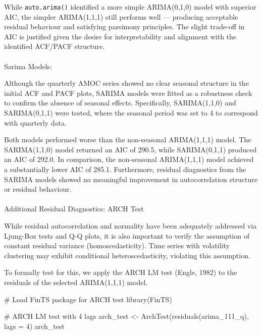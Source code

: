 \documentclass[
  11pt,
]{article}
\makeatletter
\let\oldparagraph\paragraph
\renewcommand{\paragraph}{
    \@ifstar
      \xxxParagraphStar
      \xxxParagraphNoStar
  }
\newcommand{\xxxParagraphStar}[1]{\oldparagraph*{#1}\mbox{}}
\newcommand{\xxxParagraphNoStar}[1]{\oldparagraph{#1}\mbox{}}
\newenvironment{Shaded}{\begin{snugshade}}{\end{snugshade}}
\newcommand{\AttributeTok}[1]{\textcolor[rgb]{0.40,0.45,0.13}{#1}}
\newcommand{\CommentTok}[1]{\textcolor[rgb]{0.37,0.37,0.37}{#1}}
\newcommand{\DecValTok}[1]{\textcolor[rgb]{0.68,0.00,0.00}{#1}}
\newcommand{\FunctionTok}[1]{\textcolor[rgb]{0.28,0.35,0.67}{#1}}
\newcommand{\NormalTok}[1]{\textcolor[rgb]{0.00,0.23,0.31}{#1}}
\newcommand{\OtherTok}[1]{\textcolor[rgb]{0.00,0.23,0.31}{#1}}
\makeatother
\begin{document}
While \texttt{auto.arima()} identified a more simple ARIMA(0,1,0) model
with superior AIC, the simpler ARIMA(1,1,1) still performs well ---
producing acceptable residual behaviour and satisfying parsimony
principles. The slight trade-off in AIC is justified given the desire
for interpretability and alignment with the identified ACF/PACF
structure.

\paragraph{Sarima Models:}\label{sarima-models}

Although the quarterly AMOC series showed no clear seasonal structure in
the initial ACF and PACF plots, SARIMA models were fitted as a
robustness check to confirm the absence of seasonal effects.
Specifically, SARIMA(1,1,0) and SARIMA(0,1,1) were tested, where the
seasonal period was set to 4 to correspond with quarterly data.

Both models performed worse than the non-seasonal ARIMA(1,1,1) model.
The SARIMA(1,1,0) model returned an AIC of 290.5, while SARIMA(0,1,1)
produced an AIC of 292.0. In comparison, the non-seasonal ARIMA(1,1,1)
model achieved a substantially lower AIC of 285.1. Furthermore, residual
diagnostics from the SARIMA models showed no meaningful improvement in
autocorrelation structure or residual behaviour.

\paragraph{Additional Residual Diagnostics: ARCH
Test}\label{additional-residual-diagnostics-arch-test}

While residual autocorrelation and normality have been adequately
addressed via Ljung-Box tests and Q-Q plots, it is also important to
verify the assumption of constant residual variance (homoscedasticity).
Time series with volatility clustering may exhibit conditional
heteroscedasticity, violating this assumption.

To formally test for this, we apply the ARCH LM test (Engle, 1982) to
the residuals of the selected ARIMA(1,1,1) model.

\begin{Shaded}
\begin{Highlighting}[]
\CommentTok{\# Load FinTS package for ARCH test}
\FunctionTok{library}\NormalTok{(FinTS)}

\CommentTok{\# ARCH LM test with 4 lags}
\NormalTok{arch\_test }\OtherTok{\textless{}{-}} \FunctionTok{ArchTest}\NormalTok{(}\FunctionTok{residuals}\NormalTok{(arima\_111\_q), }\AttributeTok{lags =} \DecValTok{4}\NormalTok{)}
\NormalTok{arch\_test}
\end{Highlighting}
\end{Shaded}
\end{document}
